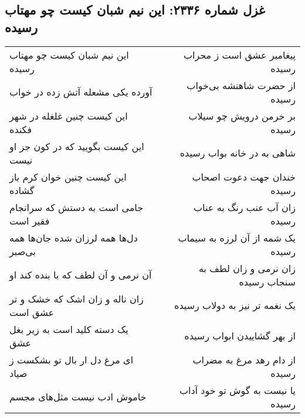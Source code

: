 \begin{center}
\section*{غزل شماره ۲۳۳۶: این نیم شبان کیست چو مهتاب رسیده}
\label{sec:2336}
\begin{longtable}{l p{0.5cm} r}
این نیم شبان کیست چو مهتاب رسیده
&&
پیغامبر عشق است ز محراب رسیده
\\
آورده یکی مشعله آتش زده در خواب
&&
از حضرت شاهنشه بی‌خواب رسیده
\\
این کیست چنین غلغله در شهر فکنده
&&
بر خرمن درویش چو سیلاب رسیده
\\
این کیست بگویید که در کون جز او نیست
&&
شاهی به در خانه بواب رسیده
\\
این کیست چنین خوان کرم باز گشاده
&&
خندان جهت دعوت اصحاب رسیده
\\
جامی است به دستش که سرانجام فقیر است
&&
زان آب عنب رنگ به عناب رسیده
\\
دل‌ها همه لرزان شده جان‌ها همه بی‌صبر
&&
یک شمه از آن لرزه به سیماب رسیده
\\
آن نرمی و آن لطف که با بنده کند او
&&
زان نرمی و زان لطف به سنجاب رسیده
\\
زان ناله و زان اشک که خشک و تر عشق است
&&
یک نغمه تر نیز به دولاب رسیده
\\
یک دسته کلید است به زیر بغل عشق
&&
از بهر گشاییدن ابواب رسیده
\\
ای مرغ دل ار بال تو بشکست ز صیاد
&&
از دام رهد مرغ به مضراب رسیده
\\
خاموش ادب نیست مثل‌های مجسم
&&
یا نیست به گوش تو خود آداب رسیده
\\
\end{longtable}
\end{center}
